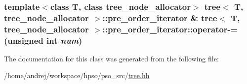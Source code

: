 \hypertarget{classtree_1_1pre__order__iterator_722aedfd8f8be3490324a587d17cb133}{
\subsubsection{\setlength{\rightskip}{0pt plus 5cm}template$<$class T, class tree\_\-node\_\-allocator$>$ {\bf tree}$<$ T, tree\_\-node\_\-allocator $>$::{\bf pre\_\-order\_\-iterator} \& {\bf tree}$<$ T, tree\_\-node\_\-allocator $>$::pre\_\-order\_\-iterator::operator-= (unsigned int {\em num})}}
\label{classtree_1_1pre__order__iterator_722aedfd8f8be3490324a587d17cb133}




The documentation for this class was generated from the following file:\begin{CompactItemize}
\item 
/home/andrej/workspace/hpso/pso\_\-src/\hyperlink{tree_8hh}{tree.hh}\end{CompactItemize}

